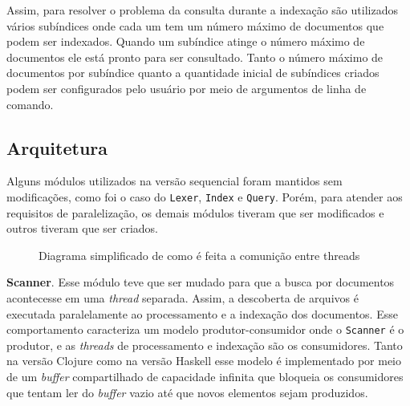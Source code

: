Assim, para resolver o problema da consulta durante a indexação são utilizados vários subíndices onde cada um tem um número máximo de documentos que podem ser indexados. Quando um subíndice atinge o número máximo de documentos ele está pronto para ser consultado. Tanto o número máximo de documentos por subíndice quanto a quantidade inicial de subíndices criados podem ser configurados pelo usuário por meio de argumentos de linha de comando.

\subsection{Arquitetura}

Alguns módulos utilizados na versão sequencial foram mantidos sem modificações, como foi o caso do \verb|Lexer|, \verb|Index| e \verb|Query|. Porém, para atender aos requisitos de paralelização, os demais módulos tiveram que ser modificados e outros tiveram que ser criados.

\begin{figure}[h]
 \centering
 \def\svgwidth{0.6\columnwidth}
 
 \caption{Diagrama simplificado de como é feita a comunição entre threads}
\end{figure}

\textbf{Scanner}. Esse módulo teve que ser mudado para que a busca por documentos acontecesse em uma \emph{thread} separada. Assim, a descoberta de arquivos é executada paralelamente ao processamento e a indexação dos documentos. Esse comportamento caracteriza um modelo produtor-consumidor onde o \verb|Scanner| é o produtor, e as \emph{threads} de processamento e indexação são os consumidores. Tanto na versão Clojure como na versão Haskell esse modelo é implementado por meio de um \emph{buffer} compartilhado de capacidade infinita que bloqueia os consumidores que tentam ler do \emph{buffer} vazio até que novos elementos sejam produzidos.

